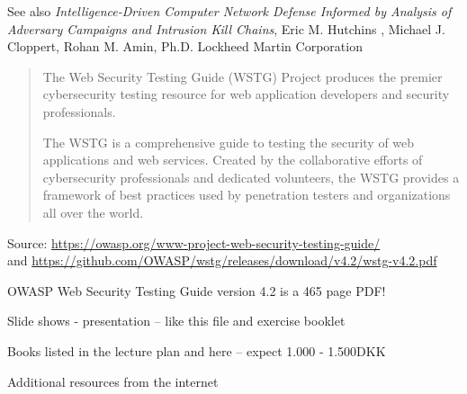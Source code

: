 \documentclass[Screen16to9,17pt]{foils}
\begin{document}



\begin{list2}
\item See also \emph{Intelligence-Driven Computer Network Defense Informed by Analysis of Adversary Campaigns and Intrusion Kill Chains}, Eric M. Hutchins , Michael J. Cloppert, Rohan M. Amin, Ph.D. Lockheed Martin Corporation\\{\footnotesize
 }
\end{list2}



\begin{quote}
The Web Security Testing Guide (WSTG) Project produces the premier cybersecurity testing resource for web application developers and security professionals.

The WSTG is a comprehensive guide to testing the security of web applications and web services. Created by the collaborative efforts of cybersecurity professionals and dedicated volunteers, the WSTG provides a framework of best practices used by penetration testers and organizations all over the world.
\end{quote}
Source: \url{https://owasp.org/www-project-web-security-testing-guide/} \\
and \url{https://github.com/OWASP/wstg/releases/download/v4.2/wstg-v4.2.pdf}

\begin{list2}
    \item OWASP Web Security Testing Guide version 4.2 is a 465 page PDF!
\end{list2}




\begin{list2}
\item Slide shows - presentation -- like this file and exercise booklet
\item Books listed in the lecture plan and here -- expect 1.000 - 1.500DKK
\item Additional resources from the internet
\end{list2}
\end{document}

